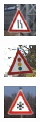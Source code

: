 \begin{figure}
\begin{subfigure}{.19\linewidth}
\end{subfigure}
\begin{subfigure}{.19\linewidth}
\includegraphics[width=0.7\linewidth]{imgs/missing/00001_00026}
\end{subfigure}
\begin{subfigure}{.19\linewidth}
\includegraphics[width=0.7\linewidth]{imgs/missing/00003_00021}
\end{subfigure}%
\begin{subfigure}{.19\linewidth}
\includegraphics[width=0.7\linewidth]{imgs/missing/00004_00016}

\end{subfigure}
\end{figure}
